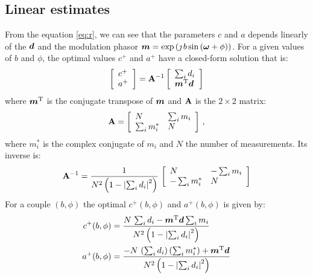\documentclass[a4paper,11pt,twoside]{scrartcl}
\begin{document}
\subsection{Linear estimates}
From the equation \ref{eq:r}, we can see that the parameters  $c$ and $a$ depends linearly of the  $\boldsymbol{d}$ and the modulation phasor $\boldsymbol{m} = \exp\left( \jmath \, b \sin\left( \boldsymbol{\omega} + \phi\right)\right)$. For a given values of $b$ and $\phi$, the optimal values $c^+$ and $a^+$ have a closed-form solution that is:
\begin{equation}
    \left[\begin{array}{l}
    c^+\\
    a^+
    \end{array}\right] = \mathbf{A}^{-1} 
    \left[\begin{array}{l}
    \sum_i d_i\\
    \boldsymbol{m}^{\mathrm{T}}\boldsymbol{d}
    \end{array}\right] 
\end{equation}
where $\boldsymbol{m}^{\mathrm{T}}$ is the conjugate transpose of $\boldsymbol{m}$ and $\mathbf{A}$ is the $2\times2$ matrix:
\begin{equation}
    \mathbf{A} = \left[\begin{array}{ll}
    N & \sum_i m_i\\
    \sum_i  m_i^* & N
    \end{array}\right] \,,
\end{equation}
where $m_i^*$ is the complex conjugate of $m_i$ and $N$  the number of measurements. Its inverse is:
\begin{equation}
   \mathbf{A}^{-1} =  \frac{1}{N^2 \left(1 - \left\vert  \sum_i d_i\right\vert^2\right)}\,\left[\begin{array}{ll}
    N & - \sum_i m_i\\
    - \sum_i  m_i^* & N
    \end{array}\right] 
\end{equation}
For a couple $(b,\phi)$ the optimal $c^+(b,\phi)$ and $a^+(b,\phi)$ is given by:
\begin{align}
    c^+(b,\phi) &= \frac{N\,\sum_i d_i - \boldsymbol{m}^{\mathrm{T}}\boldsymbol{d}\sum_i m_i}{N^2 \left(1 - \left\vert  \sum_i d_i\right\vert^2\right)}\\
    a^+(b,\phi) &= \frac{ -N\,\left(\sum_i d_i\right)  \left(\sum_i  m_i^*\right)+ \boldsymbol{m}^{\mathrm{T}}\boldsymbol{d}}{N^2 \left(1 - \left\vert  \sum_i d_i\right\vert^2\right)}
\end{align}
\end{document}
